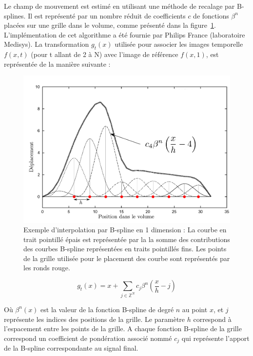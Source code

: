 Le champ de mouvement est estimé en utilisant une méthode de recalage par B-splines. Il est représenté par un nombre réduit de coefficients $c$ de fonctions $\beta^n$ placées sur une grille dans le volume, comme présenté dans la figure~\ref{fig:Bspline}. L'implémentation de cet algorithme a été fournie par Philips France (laboratoire Medisys). La transformation $g_t(x)$ utilisée pour associer les images temporelle  $f(x,t)$ (pour t allant de 2 à N) avec l'image de référence $f(x,1)$, est représentée de la manière suivante :

\begin{figure}
\centering
\includegraphics[width=17cm]{images/Bspline}
\caption[Exemple d'interpolation par B-spline]{Exemple d'interpolation par B-spline en 1 dimension : La courbe en trait pointillé épais est représentée par la la somme des contributions des courbes B-spline représentées en traits pointillés fins. Les points de la grille utilisée pour le placement des courbe sont représentés par les ronds rouge.}
\label{fig:Bspline}
\end{figure}


\begin{equation}
  g_t(x)=x + \sum\limits_{j\in \mathbb{Z}^N} c_j \beta^n \left( \frac{x}{h}-j \right)
\end{equation}

Où $\beta^n(x)$ est la valeur de la fonction B-spline de degré $n$ au point $x$, et $j$ représente les indices des positions de la grille. Le paramètre $h$ correspond à l'espacement entre les points de la grille. A chaque fonction B-spline de la grille correspond un coefficient de pondération associé nommé $c_j$ qui représente l'apport de la B-spline correspondante au signal final.

